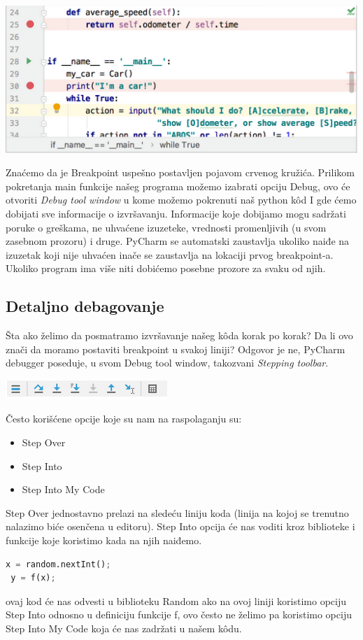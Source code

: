 \documentclass[a4paper]{article}
\begin{document}
\includegraphics[scale = 0.4]{1}

Znaćemo da je Breakpoint uspešno postavljen pojavom crvenog kružića. Prilikom pokretanja main funkcije našeg programa možemo izabrati opciju Debug, ovo će otvoriti \emph{Debug tool window} u kome možemo pokrenuti naš python k\^{o}d I gde ćemo dobijati sve informacije o izvršavanju. Informacije koje dobijamo mogu sadržati poruke o greškama, ne uhvaćene izuzeteke, vrednosti promenljivih (u svom zasebnom prozoru) i druge. PyCharm se automatski zaustavlja ukoliko naiđe na izuzetak koji nije uhvaćen inače se zaustavlja na lokaciji prvog breakpoint-a. Ukoliko program ima više niti dobićemo posebne prozore za svaku od njih.
\subsection{Detaljno debagovanje}
Šta ako želimo da posmatramo izvršavanje našeg k\^{o}da korak po korak? Da li ovo znači da moramo postaviti breakpoint u svakoj liniji? Odgovor je ne, PyCharm debugger poseduje, u svom Debug tool window, takozvani \emph{Stepping toolbar}.

\includegraphics[scale = 0.6]{2}

Često korišćene opcije koje su nam na raspolaganju su:
\begin{itemize}
\item  Step Over
\item  Step Into
\item Step Into My Code
\end{itemize}
Step Over jednostavno prelazi na sledeću liniju koda (linija na kojoj se trenutno nalazimo biće osenčena u editoru). Step Into opcija će nas voditi kroz biblioteke i funkcije koje koristimo kada na njih naiđemo.
\begin{lstlisting}[language = Python, caption={Primer neki}]
 x = random.nextInt();
 y = f(x);
\end{lstlisting} 
 ovaj kod će nas odvesti u biblioteku Random ako na ovoj liniji koristimo opciju Step Into odnosno u definiciju funkcije f, ovo često ne želimo pa koristimo opciju Step Into My Code koja će nas zadržati u našem k\^{o}du. 
\end{document}

